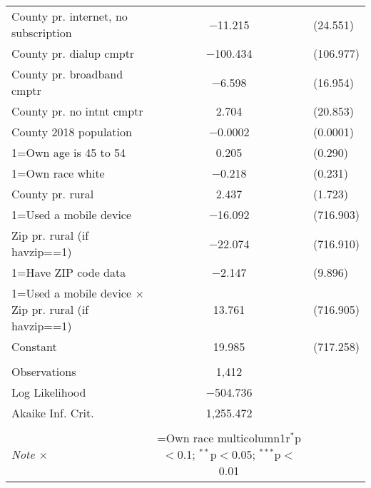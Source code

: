 \begin{table}[!htbp]
\begin{tabular}{@{\extracolsep{5pt}}lc}
  County pr. internet, no subscription & $-$11.215 & (24.551) \\ 
  County pr. dialup cmptr & $-$100.434 & (106.977) \\ 
  County pr. broadband cmptr & $-$6.598 & (16.954) \\ 
  County pr. no intnt cmptr & 2.704 & (20.853) \\ 
  County 2018 population & $-$0.0002 & (0.0001) \\ 
  1=Own age is 45 to 54 & 0.205 & (0.290) \\ 
  1=Own race white & $-$0.218 & (0.231) \\ 
  County pr. rural & 2.437 & (1.723) \\ 
  1=Used a mobile device & $-$16.092 & (716.903) \\ 
  Zip pr. rural (if havzip==1) & $-$22.074 & (716.910) \\ 
  1=Have ZIP code data & $-$2.147 & (9.896) \\ 
  1=Used a mobile device $\times$ Zip pr. rural (if havzip==1) & 13.761 & (716.905) \\ 
  Constant & 19.985 & (717.258) \\ 
 \hline \\[-1.8ex] 
Observations & 1,412 \\ 
Log Likelihood & $-$504.736 \\ 
Akaike Inf. Crit. & 1,255.472 \\ 
\hline 
\hline \\[-1.8ex] 
\textit{Note $\times$ }  & \1=Own race multicolumn{1}{r}{$^{*}$p$<$0.1; $^{**}$p$<$0.05; $^{***}$p$<$0.01} \\ 
\end{tabular} 
\end{table} 
